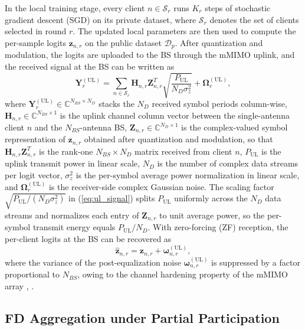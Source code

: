 \documentclass[journal]{IEEEtran}
\begin{document}
In the local training stage, every client $n \in \mathcal{S}_r$ runs $K_r$ steps of stochastic gradient descent (SGD) on its private dataset, where $\mathcal{S}_r$ denotes the set of clients selected in round $r$. The updated local parameters are then used to compute the per-sample logits $\bm{z}_{n,r}$ on the public dataset $\mathcal{D}_p$. After quantization and modulation, the logits are uploaded to the BS through the mMIMO uplink, and the received signal at the BS can be written as
\begin{equation}
\bm{Y}^{(\text{UL})}_{r} = \sum_{n \in \mathcal{S}_r} \bm{H}_{n,r} \bm{Z}_{n,r}^{T} \sqrt{\frac{P_{\text{UL}}}{N_D \sigma_z^2}} + \bm{\Omega}^{(\text{UL})}_{r},
\label{eq:ul_signal}
\end{equation}
where $\bm{Y}^{(\text{UL})}_{r} \in \mathbb{C}^{N_{BS} \times N_D}$ stacks the $N_D$ received symbol periods column-wise, $\bm{H}_{n,r} \in \mathbb{C}^{N_{BS} \times 1}$ is the uplink channel column vector between the single-antenna client $n$ and the $N_{BS}$-antenna BS, $\bm{Z}_{n,r} \in \mathbb{C}^{N_D \times 1}$ is the complex-valued symbol representation of $\bm{z}_{n,r}$ obtained after quantization and modulation, so that $\bm{H}_{n,r}\bm{Z}_{n,r}^{T}$ is the rank-one $N_{BS}\times N_D$ matrix received from client $n$, $P_{\text{UL}}$ is the uplink transmit power in linear scale, $N_D$ is the number of complex data streams per logit vector, $\sigma_z^2$ is the per-symbol average power normalization in linear scale, and $\bm{\Omega}^{(\text{UL})}_{r}$ is the receiver-side complex Gaussian noise. The scaling factor $\sqrt{P_{\text{UL}}/(N_D \sigma_z^2)}$ in (\ref{eq:ul_signal}) splits $P_{\text{UL}}$ uniformly across the $N_D$ data streams and normalizes each entry of $\bm{Z}_{n,r}$ to unit average power, so the per-symbol transmit energy equals $P_{\text{UL}}/N_D$. With zero-forcing (ZF) reception, the per-client logits at the BS can be recovered as
\begin{equation}
\hat{\bm{z}}_{n,r} = \bm{z}_{n,r} + \bm{\omega}^{(\text{UL})}_{n,r},
\label{eq:ul_zf}
\end{equation}
where the variance of the post-equalization noise $\bm{\omega}^{(\text{UL})}_{n,r}$ is suppressed by a factor proportional to $N_{BS}$, owing to the channel hardening property of the mMIMO array \cite{mu2024fedtskd}, \cite{vu2020cell}.

\subsection{FD Aggregation under Partial Participation}
\label{ssec:fd-aggregation}
\end{document}
